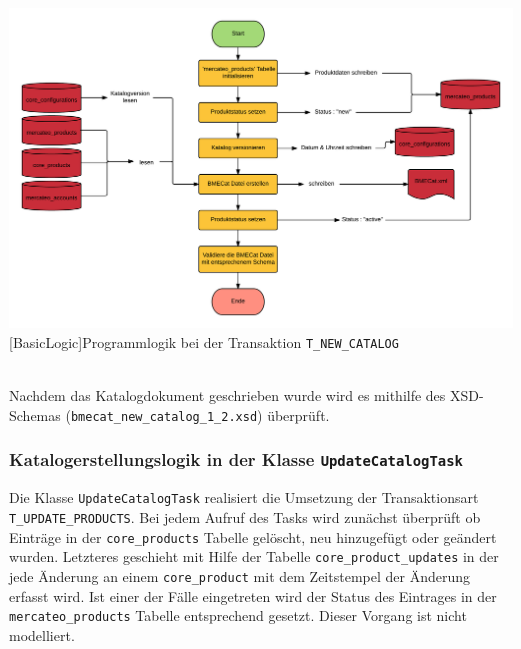 	\begin{minipage}{\linewidth}
		\vspace{1em}
		\centering
		\includegraphics[width=1 \linewidth]{img/newCatalogComplete}
		[BasicLogic]{Programmlogik  bei der Transaktion \texttt{T\_NEW\_CATALOG}}
		\vspace{1em}
	\end{minipage}\\
	
	Nachdem das Katalogdokument geschrieben wurde wird es mithilfe des  XSD-Schemas (\texttt{bmecat\_new\_catalog\_1\_2.xsd}) überprüft. 
		
	\subsubsection{Katalogerstellungslogik in der Klasse \texttt{UpdateCatalogTask} }
    Die	Klasse \texttt{UpdateCatalogTask} realisiert die Umsetzung der Transaktionsart
	\texttt{T\_UPDATE\_PRODUCTS}.
	Bei jedem  Aufruf des Tasks wird zunächst überprüft ob Einträge in der \texttt{core\_products} Tabelle gelöscht, neu hinzugefügt oder geändert wurden. Letzteres geschieht mit Hilfe der Tabelle \texttt{core\_product\_updates} in der jede Änderung an einem \texttt{core\_product} mit dem Zeitstempel der Änderung erfasst wird. Ist einer der Fälle eingetreten wird der Status des Eintrages in der \texttt{mercateo\_products} Tabelle entsprechend gesetzt. Dieser Vorgang ist nicht modelliert.
	
